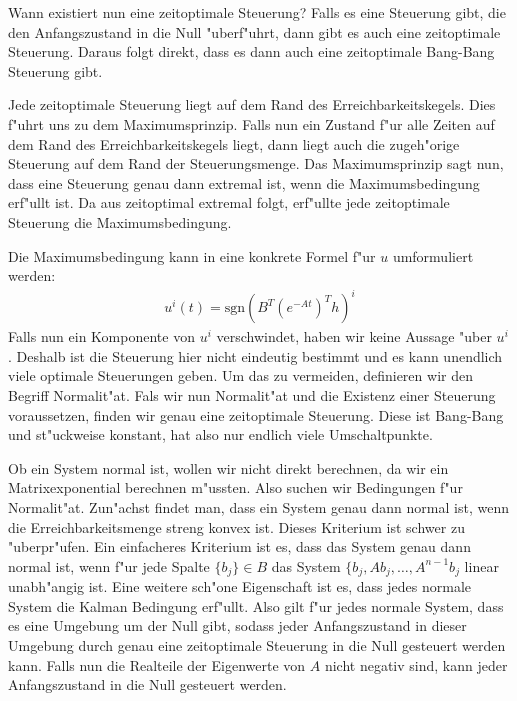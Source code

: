 \documentclass[pdftex,a4paper,oneside]{scrbook}
\begin{document}
Wann existiert nun eine zeitoptimale Steuerung? Falls es eine Steuerung gibt, die den Anfangszustand in die Null "uberf"uhrt, dann gibt es auch eine zeitoptimale Steuerung. Daraus folgt direkt, dass es dann auch eine zeitoptimale Bang-Bang Steuerung gibt. 


Jede zeitoptimale Steuerung liegt auf dem Rand des Erreichbarkeitskegels. 
Dies f"uhrt uns zu dem Maximumsprinzip. Falls nun ein Zustand f"ur alle Zeiten auf dem Rand des Erreichbarkeitskegels liegt, dann liegt auch die zugeh"orige Steuerung auf dem Rand der Steuerungsmenge. Das Maximumsprinzip sagt nun, dass eine Steuerung genau dann extremal ist, wenn die Maximumsbedingung erf"ullt ist. Da aus zeitoptimal extremal folgt, erf"ullte jede zeitoptimale Steuerung die Maximumsbedingung. 

Die Maximumsbedingung kann in eine konkrete Formel f"ur $u$ umformuliert werden:
\begin{align*}
	u^i(t) = \text{sgn} (B^T (e^{-At})^T h)^i
\end{align*}
Falls nun ein Komponente von  $u^i$ verschwindet, haben wir keine Aussage "uber $u^i$. Deshalb ist die Steuerung hier nicht eindeutig bestimmt und es kann unendlich viele optimale Steuerungen geben. Um das zu vermeiden, definieren wir den Begriff Normalit"at. Fals wir nun Normalit"at und die Existenz einer Steuerung voraussetzen, finden wir genau eine zeitoptimale Steuerung. Diese ist Bang-Bang und st"uckweise konstant, hat also nur endlich viele Umschaltpunkte. 

Ob ein System normal ist, wollen wir nicht direkt berechnen, da wir ein Matrixexponential berechnen m"ussten. Also suchen wir Bedingungen f"ur Normalit"at. Zun"achst findet man, dass ein System genau dann normal ist, wenn die Erreichbarkeitsmenge streng konvex ist. Dieses Kriterium ist schwer zu "uberpr"ufen. Ein einfacheres Kriterium ist es, dass das System genau dann normal ist, wenn f"ur jede Spalte $\{b_j\} \in B$ das System $ \{b_j, A b_j, \dots, A^{n-1} b_j$ linear unabh"angig ist.  
Eine weitere sch"one Eigenschaft ist es, dass jedes normale System die Kalman Bedingung erf"ullt. 
Also gilt f"ur jedes normale System, dass es eine Umgebung um der Null gibt, sodass jeder Anfangszustand in dieser Umgebung durch genau eine zeitoptimale Steuerung in die Null gesteuert werden kann. Falls nun die Realteile der Eigenwerte von $A$ nicht negativ sind, kann jeder Anfangszustand in die Null gesteuert werden. 
\end{document}
